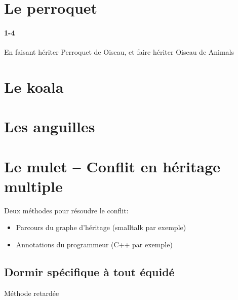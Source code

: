 \documentclass{article}
\begin{document}
	\maketitle
	\section{Le perroquet}
		
		
	\newpage
		
		
	\paragraph{1-4} En faisant hériter Perroquet de Oiseau, et faire hériter Oiseau de Animals
		
	\newpage
	\section{Le koala}
		
		
	\newpage
	\section{Les anguilles}
		
		
		
		
		
	\newpage
	\section{Le mulet -- Conflit en héritage multiple}
	Deux méthodes pour résoudre le conflit:
	\begin{itemize}
		\item Parcours du graphe d'héritage (smalltalk par exemple)
		\item Annotations du programmeur (C++ par exemple)
	\end{itemize}
	\begin{center}  \end{center}
	\subsection{Dormir spécifique à tout équidé}
	Méthode retardée
	
		
		
		
		
	\newpage
\end{document}
